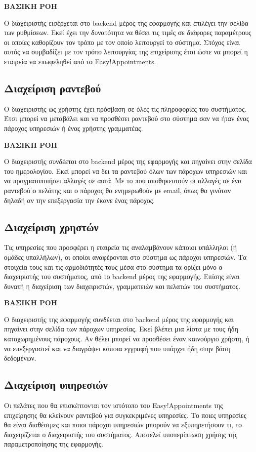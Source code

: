\textbf{ΒΑΣΙΚΗ ΡΟΗ}

Ο διαχειριστής εισέρχεται στο backend μέρος της εφαρμογής και επιλέγει την σελίδα των ρυθμίσεων. Εκεί έχει την δυνατότητα να θέσει τις τιμές σε διάφορες παραμέτρους οι οποίες καθορίζουν τον τρόπο με τον οποίο λειτουργεί το σύστημα. Στόχος είναι αυτός να συμβαδίζει με τον τρόπο λειτουργίας της επιχείρισης έτσι ώστε να μπορεί η εταιρεία να επωφεληθεί από το Easy!Appointments.

\subsection{Διαχείριση ραντεβού}
Ο διαχειριστής ως χρήστης έχει πρόσβαση σε όλες τις πληροφορίες του συστήματος. Έτσι μπορεί να μεταβάλει και να προσθέσει ραντεβού στο σύστημα σαν να ήταν ένας πάροχος υπηρεσιών ή ένας χρήστης γραμματέας.

\textbf {ΒΑΣΙΚΗ ΡΟΗ}

Ο διαχειριστής συνδέεται στο backend μέρος της εφαρμογής και πηγαίνει στην σελίδα του ημερολογίου. Εκεί μπορεί να δει τα ραντεβού όλων των πάροχων υπηρεσιών και να πραγματοποιήσει αλλαγές σε αυτά. Με το που αποθηκευτούν οι αλλαγές σε ένα ραντεβού ο πελάτης και ο πάροχος θα ενημερωθούν με email, όπως θα γινόταν δηλαδή αν την επεξεργασία την έκανε ένας πάροχος.

\subsection {Διαχείριση χρηστών}
Τις υπηρεσίες που προσφέρει η εταιρεία τις αναλαμβάνουν κάποιοι υπάλληλοι (ή ομάδες υπαλλήλων), οι οποίοι αναφέρονται στο σύστημα ως πάροχοι υπηρεσιών. Τα στοιχεία τους και τις αρμοδιότητές τους μέσα στο σύστημα τα ορίζει μόνο ο διαχειριστής του συστήματος, από το backend μέρος της εφαρμογής. Επίσης είναι δυνατή η διαχείριση των διαχειριστών, γραμματειών και πελατών του συστήματος.

\textbf{ΒΑΣΙΚΗ ΡΟΗ}

Ο διαχειριστής της εφαρμογής συνδέεται στο backend μέρος της εφαρμογής και πηγαίνει στην σελίδα των πάροχων υπηρεσίας. Εκεί βλέπει μια λίστα με τους ήδη καταχωρημένους πάροχους. Αν θέλει μπορεί να προσθέσει έναν καινούργιο χρήστη, ή να επεξεργαστεί και να διαγράψει κάποια εγγραφή που υπάρχει ήδη στην βάση δεδομένων.

\subsection {Διαχείριση υπηρεσιών}
Οι πελάτες που θα επισκέπτονται τον ιστότοπο του Easy!Appointments της επιχείρησης θα κλείνουν ραντεβού για συγκεκριμένες υπηρεσίες. Το ποιες υπηρεσίες θα είναι διαθέσιμες και ποιοι πάροχοι υπηρεσιών μπορούν να εξυπηρετήσουν τι, το διαχειρίζεται ο διαχειριστής του συστήματος. Αποτελεί υποπερίπτωση χρήσης της παραμετροποίησης της εφαρμογής.